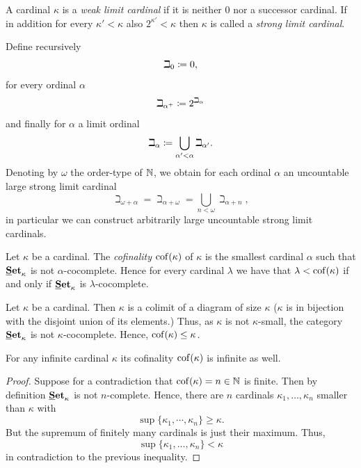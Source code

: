 \begin{definition}
	A cardinal $\kappa$ is a \emph{weak limit cardinal} if it is neither $0$ nor a successor cardinal. If in addition for every $\kappa' < \kappa$ also $2^{\kappa'} < \kappa$ then $\kappa$ is called a \emph{strong limit cardinal}. 
\end{definition}

\begin{construction}
	\label{construction: Beth-numbers and existence of strong limit cardinals}	
	Define recursively
		$$\beth_0 \coloneqq 0,$$
	for every ordinal $\alpha$
		$$\beth_{\alpha^+} \coloneqq 2^{\beth_\alpha}$$
	and finally for $\alpha$ a limit ordinal
		$$\beth_\alpha \coloneqq \bigcup_{\alpha' < \alpha} \beth_{\alpha'}.$$
	Denoting by $\omega$ the order-type of ${\mathbb{N}}$, we obtain for each ordinal $\alpha$ an uncountable large strong limit cardinal
		$$\beth_{\omega + \alpha} = \beth_{\alpha + \omega} = \bigcup_{n < \omega} \beth_{\alpha + n},$$
	in particular we can construct arbitrarily large uncountable strong limit cardinals.
\end{construction}

\begin{definition}
	Let $\kappa$ be a cardinal. The \emph{cofinality} ${\operatorname{cof}(\kappa)}$ of $\kappa$ is the smallest cardinal $\alpha$ such that ${{{\mathbf{\underline{S}et}}}_{\kappa}}$ is not $\alpha$-cocomplete. Hence for every cardinal $\lambda$ we have that $\lambda < {\operatorname{cof}(\kappa)}$ if and only if ${{{\mathbf{\underline{S}et}}}_{\kappa}}$ is $\lambda$-cocomplete.
\end{definition}

\begin{remark}
	\label{remark: upper bound of cofinality}
	
	Let $\kappa$ be a cardinal. Then $\kappa$ is a colimit of a diagram of size $\kappa$ ($\kappa$ is in bijection with the disjoint union of its elements.) Thus, as $\kappa$ is not $\kappa$-small, the category ${{{\mathbf{\underline{S}et}}}_{\kappa}}$ is not $\kappa$-cocomplete. Hence, ${\operatorname{cof}(\kappa)} \le \kappa$.
\end{remark}

\begin{lemma}
	For any infinite cardinal $\kappa$ its cofinality ${\operatorname{cof}(\kappa)}$ is infinite as well.
\end{lemma}
\begin{proof}
	Suppose for a contradiction that ${\operatorname{cof}(\kappa)} = n \in {\mathbb{N}}$ is finite. Then by definition ${{{\mathbf{\underline{S}et}}}_{\kappa}}$ is not $n$-complete. Hence, there are $n$ cardinals $\kappa_1,\dots,\kappa_n$ smaller than $\kappa$ with
		$$\sup\{\kappa_1,\cdots,\kappa_n\} \ge \kappa.$$
	But the supremum of finitely many cardinals is just their maximum. Thus,
		$$\sup\{\kappa_1,\dots,\kappa_n\} < \kappa$$
	in contradiction to the previous inequality.
\end{proof}

